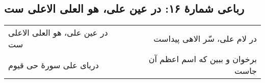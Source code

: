 \begin{center}
\section*{رباعی شمارهٔ ۱۶: در عین علی، هو العلی الاعلی ست}
\label{sec:016}
\begin{longtable}{l p{0.5cm} r}
در عین علی، هو العلی الاعلی ست
&&
در لام علی، سّر الاهی پیداست
\\
دریای علی سورهٔ حی قیوم
&&
برخوان و ببین که اسم اعظم آن جاست
\\
\end{longtable}
\end{center}
